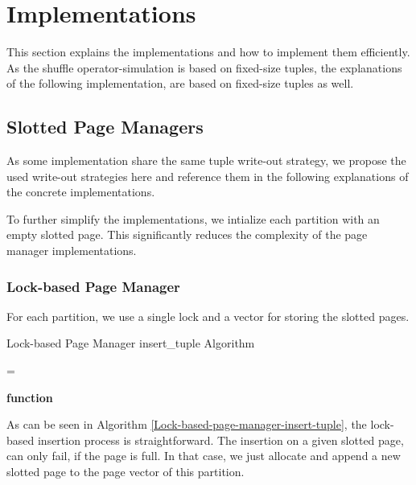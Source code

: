 
\chapter{Implementations}\label{chapter:implementations}
This section explains the implementations and how to implement them efficiently. As the shuffle operator-simulation is based on fixed-size tuples, the explanations of the following implementation, are based on fixed-size tuples as well.

\section{Slotted Page Managers}
As some implementation share the same tuple write-out strategy, we propose the used write-out strategies here and reference them in the following explanations of the concrete implementations.

To further simplify the implementations, we intialize each partition with an empty slotted page. This significantly reduces the complexity of the page manager implementations.

\subsection{Lock-based Page Manager}
For each partition, we use a single lock and a vector for storing the slotted pages.
\begin{algorithm}
\caption{Lock-based Page Manager insert\_tuple Algorithm}\label{Lock-based-page-manager-insert-tuple}
=


\textbf{function}
\end{algorithm}
As can be seen in Algorithm \ref{Lock-based-page-manager-insert-tuple}, the lock-based insertion process is straightforward.
The insertion on a given slotted page, can only fail, if the page is full. In that case, we just allocate and append a new slotted page to the page vector of this partition.

